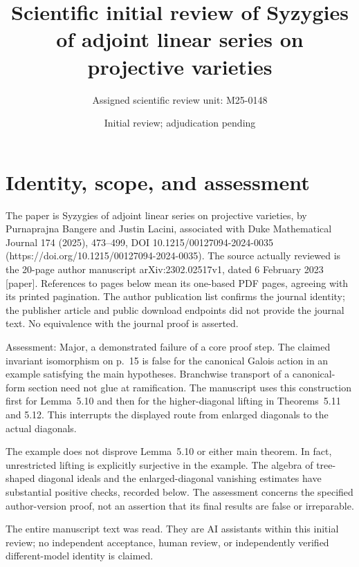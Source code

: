 \documentclass[10pt]{article}
\title{Scientific initial review of
Syzygies of adjoint linear series on projective varieties}
\author{Assigned scientific review unit: M25-0148}
\date{Initial review; adjudication pending}
\begin{document}
\maketitle
\section*{Identity, scope, and assessment}
The paper is Syzygies of adjoint linear series on projective varieties, by Purnaprajna Bangere and Justin Lacini, associated with Duke Mathematical Journal 174 (2025), 473–499, DOI 10.1215/00127094-2024-0035 (https://doi.org/10.1215/00127094-2024-0035). The source actually reviewed is the 20-page author manuscript arXiv:2302.02517v1, dated 6 February 2023 [paper]. References to pages below mean its one-based PDF pages, agreeing with its printed pagination. The author publication list confirms the journal identity; the publisher article and public download endpoints did not provide the journal text. No equivalence with the journal proof is asserted.\par
Assessment: Major, a demonstrated failure of a core proof step. The claimed invariant isomorphism on p. 15 is false for the canonical Galois action in an example satisfying the main hypotheses. Branchwise transport of a canonical-form section need not glue at ramification. The manuscript uses this construction first for Lemma 5.10 and then for the higher-diagonal lifting in Theorems 5.11 and 5.12. This interrupts the displayed route from enlarged diagonals to the actual diagonals.\par
The example does not disprove Lemma 5.10 or either main theorem. In fact, unrestricted lifting is explicitly surjective in the example. The algebra of tree-shaped diagonal ideals and the enlarged-diagonal vanishing estimates have substantial positive checks, recorded below. The assessment concerns the specified author-version proof, not an assertion that its final results are false or irreparable.\par
The entire manuscript text was read. They are AI assistants within this initial review; no independent acceptance, human review, or independently verified different-model identity is claimed.\par
\end{document}
